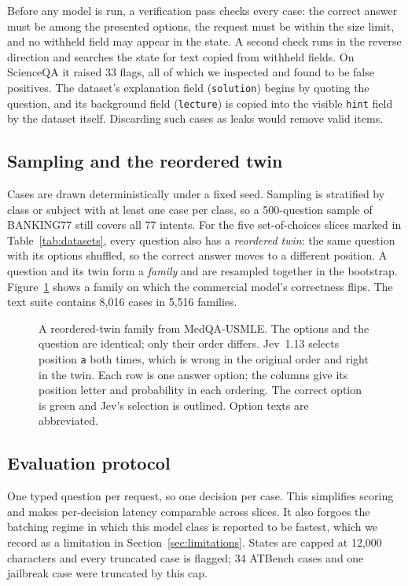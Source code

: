 Before any model is run, a verification pass checks every case: the correct
answer must be among the presented options, the request must be within the size
limit, and no withheld field may appear in the state. A second check runs in the
reverse direction and searches the state for text copied from withheld fields.
On ScienceQA it raised 33 flags, all of which we inspected and found to be false
positives. The dataset's explanation field (\texttt{solution}) begins by quoting
the question, and its background field (\texttt{lecture}) is copied into the
visible \texttt{hint} field by the dataset itself. Discarding such cases as leaks
would remove valid items.

\subsection{Sampling and the reordered twin}
\label{sec:sampling}

Cases are drawn deterministically under a fixed seed. Sampling is stratified by
class or subject with at least one case per class, so a 500-question sample of
BANKING77 still covers all 77 intents. For the five set-of-choices slices marked
in Table~\ref{tab:datasets}, every question also has a \emph{reordered twin}:
the same question with its options shuffled, so the correct answer moves to a
different position. A question and its twin form a \emph{family} and are
resampled together in the bootstrap. Figure~\ref{fig:reorder} shows a family on
which the commercial model's correctness flips. The text suite contains 8{,}016
cases in 5{,}516 families.

\begin{figure}[t]
\centering

\caption{A reordered-twin family from MedQA-USMLE. The options and the question
are identical; only their order differs. Jev~1.13 selects position \texttt{a}
both times, which is wrong in the original order and right in the twin. Each row
is one answer option; the columns give its position letter and probability in each ordering. The correct option is green and Jev's selection is outlined. Option texts are abbreviated.}
\label{fig:reorder}
\end{figure}

\subsection{Evaluation protocol}

One typed question per request, so one decision per case. This simplifies scoring and makes per-decision latency comparable across slices. It also forgoes the batching regime in which this model class is reported to be fastest, which we record as a limitation in Section~\ref{sec:limitations}. States are capped at 12{,}000 characters and every truncated case is flagged; 34 ATBench cases and one jailbreak case were truncated by this cap.

